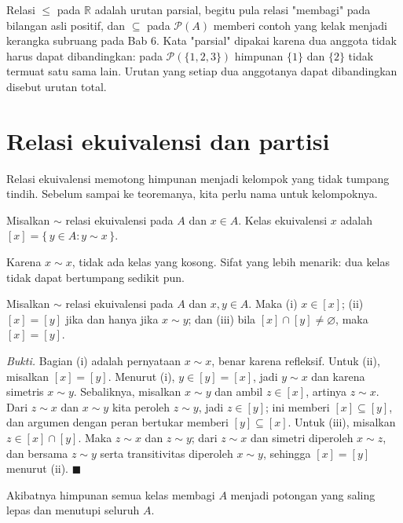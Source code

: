 Relasi $\le$ pada $\mathbb{R}$ adalah urutan parsial, begitu pula relasi "membagi"
pada bilangan asli positif, dan $\subseteq$ pada $\mathcal{P}(A)$ memberi contoh yang
kelak menjadi kerangka subruang pada Bab 6. Kata "parsial" dipakai karena dua anggota
tidak harus dapat dibandingkan: pada $\mathcal{P}(\{1,2,3\})$ himpunan $\{1\}$ dan
$\{2\}$ tidak termuat satu sama lain. Urutan yang setiap dua anggotanya dapat
dibandingkan disebut urutan total.

\section{Relasi ekuivalensi dan partisi}

Relasi ekuivalensi memotong himpunan menjadi kelompok yang tidak tumpang tindih.
Sebelum sampai ke teoremanya, kita perlu nama untuk kelompoknya.

\begin{definisi}
Misalkan $\sim$ relasi ekuivalensi pada $A$ dan $x \in A$. Kelas ekuivalensi $x$
adalah $[x] = \{\, y \in A : y \sim x \,\}$.
\end{definisi}

Karena $x \sim x$, tidak ada kelas yang kosong. Sifat yang lebih menarik: dua kelas
tidak dapat bertumpang sedikit pun.

\begin{lemma}
Misalkan $\sim$ relasi ekuivalensi pada $A$ dan $x, y \in A$. Maka (i) $x \in [x]$;
(ii) $[x] = [y]$ jika dan hanya jika $x \sim y$; dan (iii) bila
$[x] \cap [y] \neq \varnothing$, maka $[x] = [y]$.
\end{lemma}
\par\smallskip\noindent\textit{Bukti.} Bagian (i) adalah pernyataan $x \sim x$, benar
karena refleksif. Untuk (ii), misalkan $[x] = [y]$. Menurut (i),
$y \in [y] = [x]$, jadi $y \sim x$ dan karena simetris $x \sim y$. Sebaliknya,
misalkan $x \sim y$ dan ambil $z \in [x]$, artinya $z \sim x$. Dari $z \sim x$ dan
$x \sim y$ kita peroleh $z \sim y$, jadi $z \in [y]$; ini memberi
$[x] \subseteq [y]$, dan argumen dengan peran bertukar memberi $[y] \subseteq [x]$.
Untuk (iii), misalkan $z \in [x] \cap [y]$. Maka $z \sim x$ dan $z \sim y$; dari
$z \sim x$ dan simetri diperoleh $x \sim z$, dan bersama $z \sim y$ serta
transitivitas diperoleh $x \sim y$, sehingga $[x] = [y]$ menurut (ii).
\hfill$\blacksquare${\parfillskip=0pt\par}

Akibatnya himpunan semua kelas membagi $A$ menjadi potongan yang saling lepas dan
menutupi seluruh $A$.

